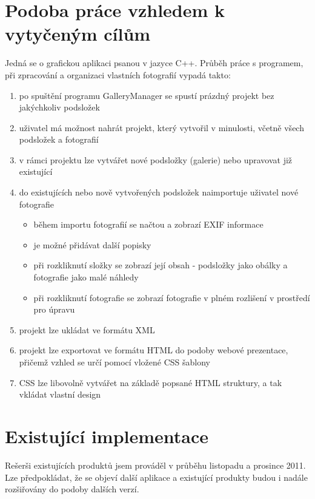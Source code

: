 \documentclass[11pt,twoside,a4paper]{book}
\begin{document}
\section{Podoba práce vzhledem k vytyčeným cílům}
\noindent
Jedná se o grafickou aplikaci psanou v jazyce C++. Průběh práce s programem, při zpracování a organizaci vlastních fotografií vypadá takto:
\begin{enumerate}

\item po spuštění programu GalleryManager se spustí prázdný projekt bez jakýchkoliv podsložek
\item uživatel má možnost nahrát projekt, který vytvořil v minulosti, včetně všech podsložek a fotografií
\item v rámci projektu lze vytvářet nové podsložky (galerie) nebo upravovat již existující
\item do existujících nebo nově vytvořených podsložek naimportuje uživatel nové fotografie
	\begin{itemize}
	\item během importu fotografií se načtou a zobrazí EXIF informace
	\item je možné přidávat další popisky
	\item při rozkliknutí složky se zobrazí její obsah - podsložky jako obálky a fotografie jako malé náhledy
	\item při rozkliknutí fotografie se zobrazí fotografie v plném rozlišení v prostředí pro úpravu
	\end{itemize}
\item projekt lze ukládat ve formátu XML
\item projekt lze exportovat ve formátu HTML do podoby webové prezentace, přičemž vzhled se určí pomocí vložené CSS šablony
\item CSS lze libovolně vytvářet na základě popsané HTML struktury, a tak vkládat vlastní design
\end{enumerate}

\section{Existující implementace}
\noindent
Rešerši existujících produktů jsem prováděl v průběhu listopadu a prosince 2011. Lze předpokládat, že se objeví další aplikace a existující produkty budou i nadále rozšiřovány do podoby dalších verzí.
\end{document}
